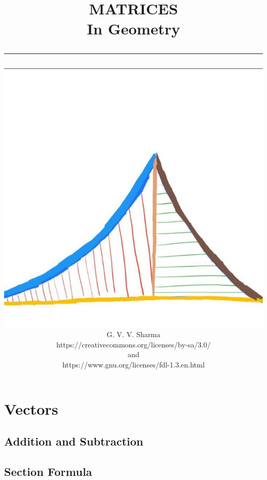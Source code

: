 \documentclass[journal]{IEEEtran}
\begin{document}

\onecolumn


\title{
	\begin{flushleft}
	MATRICES \\ In Geometry
	\\
\rule{0.4\columnwidth}{0.4pt}
\end{flushleft}
}
\author{
\vspace{7cm}
	\begin{flushleft}
\includegraphics[width=0.2\columnwidth]{figs/logo.jpg}
\\
		{	\huge G. V. V. Sharma}
		\\
\vspace{1cm}
https://creativecommons.org/licenses/by-sa/3.0/
\\
and
\\
https://www.gnu.org/licenses/fdl-1.3.en.html
	\end{flushleft}
}
\maketitle

\newpage


\tableofcontents

\newpage
\twocolumn


\renewcommand{\thefigure}{\theenumi}
\renewcommand{\thetable}{\theenumi}


\section{Vectors}
\subsection{Addition and Subtraction}

\subsection{Section Formula}

\end{document}
